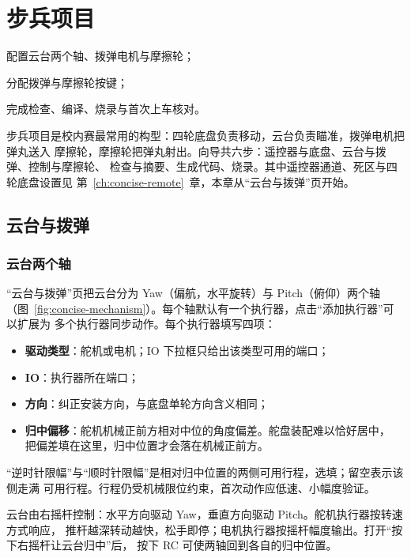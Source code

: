 \chapter{步兵项目}
\label{ch:concise-infantry}

\begin{introduction}
  \item 配置云台两个轴、拨弹电机与摩擦轮；
  \item 分配拨弹与摩擦轮按键；
  \item 完成检查、编译、烧录与首次上车核对。
\end{introduction}

步兵项目是校内赛最常用的构型：四轮底盘负责移动，云台负责瞄准，拨弹电机把弹丸送入
摩擦轮，摩擦轮把弹丸射出。向导共六步：遥控器与底盘、云台与拨弹、控制与摩擦轮、
检查与摘要、生成代码、烧录。其中遥控器通道、死区与四轮底盘设置见
第~\ref{ch:concise-remote}~章，本章从“云台与拨弹”页开始。

\section{云台与拨弹}

\subsection{云台两个轴}

“云台与拨弹”页把云台分为 Yaw（偏航，水平旋转）与 Pitch（俯仰）两个轴
（图~\ref{fig:concise-mechanism}）。每个轴默认有一个执行器，点击“添加执行器”可以扩展为
多个执行器同步动作。每个执行器填写四项：

\begin{itemize}
  \item \textbf{驱动类型}：舵机或电机；IO 下拉框只给出该类型可用的端口；
  \item \textbf{IO}：执行器所在端口；
  \item \textbf{方向}：纠正安装方向，与底盘单轮方向含义相同；
  \item \textbf{归中偏移}：舵机机械正前方相对中位的角度偏差。舵盘装配难以恰好居中，
        把偏差填在这里，归中位置才会落在机械正前方。
\end{itemize}

“逆时针限幅”与“顺时针限幅”是相对归中位置的两侧可用行程，选填；留空表示该侧走满
可用行程。行程仍受机械限位约束，首次动作应低速、小幅度验证。

云台由右摇杆控制：水平方向驱动 Yaw，垂直方向驱动 Pitch。舵机执行器按转速方式响应，
推杆越深转动越快，松手即停；电机执行器按摇杆幅度输出。打开“按下右摇杆让云台归中”后，
按下 RC 可使两轴回到各自的归中位置。

